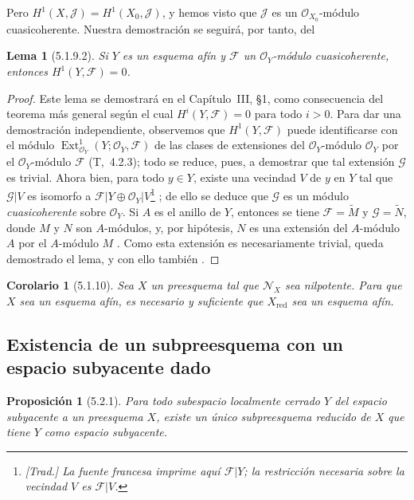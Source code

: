 \documentclass[oneside]{amsart}
\theoremstyle{ega-env-style}
\theoremstyle{ega-thm-env-style}
\newtheorem*{proposition}{Proposición}
\newtheorem*{lemma}{Lema}
\newtheorem*{corollary}{Corolario}
\theoremstyle{ega-defn-env-style}
\def\mathcal{\mathscr}
\def\sh{\mathcal}                   %
\let\EGAOriginalLabel\label
\renewcommand{\label}[1]{\phantomsection\EGAOriginalLabel{#1}}
\begin{document}
Pero $H^1(X,\mathscr{J})=H^1(X_0,\mathscr{J})$, y hemos visto que $\mathscr{J}$ es un $\mathscr{O}_{X_0}$-módulo cuasicoherente.
Nuestra demostración se seguirá, por tanto, del
\begin{lemma}[5.1.9.2]
\label{I.5.1.9.2}
Si $Y$ es un esquema afín y $\mathscr{F}$ un $\mathscr{O}_Y$-módulo cuasicoherente, entonces $H^1(Y,\mathscr{F})=0$.
\end{lemma}

\begin{proof}
Este lema se demostrará en el Capítulo~III, §1, como consecuencia del teorema más general según el cual $H^i(Y,\mathscr{F})=0$ para todo $i>0$.
Para dar una demostración independiente, observemos que $H^1(Y,\mathscr{F})$ puede identificarse con el módulo $\operatorname{Ext}^1_{\mathscr{O}_Y}
(Y;\mathscr{O}_Y,\mathscr{F})$ de las clases de extensiones del $\mathscr{O}_Y$-módulo $\mathscr{O}_Y$ por el $\mathscr{O}_Y$-módulo $\mathscr{F}$ (T,~4.2.3);
todo se reduce, pues, a demostrar que tal extensión $\mathscr{G}$ es trivial.
Ahora bien, para todo $y\in Y$, existe una vecindad $V$ de $y$ en $Y$ tal que $\mathscr{G}|V$ es isomorfo a $\mathscr{F}|Y\oplus\mathscr{O}_Y|V$\footnote{\emph{[Trad.] La fuente francesa imprime aquí $\sh{F}|Y$; la restricción necesaria sobre la vecindad $V$ es $\sh{F}|V$.}} ;
de ello se deduce que $\mathscr{G}$ es un módulo \emph{cuasicoherente} sobre $\mathscr{O}_Y$.
Si $A$ es el anillo de $Y$, entonces se tiene $\mathscr{F}=\widetilde{M}$ y $\mathscr{G}=\widetilde{N}$, donde $M$ y $N$ son $A$-módulos, y, por hipótesis, $N$ es una extensión del $A$-módulo $A$ por el $A$-módulo $M$ .
Como esta extensión es necesariamente trivial, queda demostrado el lema, y con ello también .
\end{proof}

\begin{corollary}[5.1.10]
\label{I.5.1.10}
Sea $X$ un preesquema tal que $\mathscr{N}_X$ sea nilpotente.
Para que $X$ sea un esquema afín, es necesario y suficiente que $X_{\mathrm{red}}$ sea un esquema afín.
\end{corollary}

\subsection{Existencia de un subpreesquema con un espacio subyacente dado}
\label{subsection:I.5.2}

\begin{proposition}[5.2.1]
\label{I.5.2.1}
Para todo subespacio localmente cerrado $Y$ del espacio subyacente a un preesquema $X$, existe un único subpreesquema reducido de $X$ que tiene $Y$ como espacio subyacente.
\end{proposition}
\end{document}
